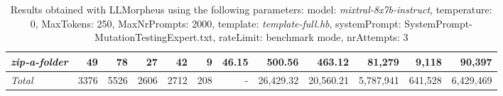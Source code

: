 \begin{table*}
{\begin{tabular}{l||r|r|r|r|r|r||r|r||r|r|r}
   \hline
   \textit{zip-a-folder} & 49 & 78 & 27 & 42 & 9 & 46.15 & 500.56 & 463.12 & 81,279 & 9,118 & 90,397 \\ 
   \hline
   \textit{Total} & 3376 & 5526 & 2606 & 2712 & 208 & - & 26,429.32  & 20,560.21 & 5,787,941 & 641,528 & 6,429,469 \\ 
 \end{tabular}
 }
 \caption{Results obtained with LLMorpheus using the following parameters: 
   model: \textit{mixtral-8x7b-instruct}, 
   temperature: 0, 
   MaxTokens: 250, 
   MaxNrPrompts: 2000, 
   template: \textit{template-full.hb}, 
   systemPrompt: SystemPrompt-MutationTestingExpert.txt, 
   rateLimit: benchmark mode, 
   nrAttempts: 3  
 }
\end{table*}

